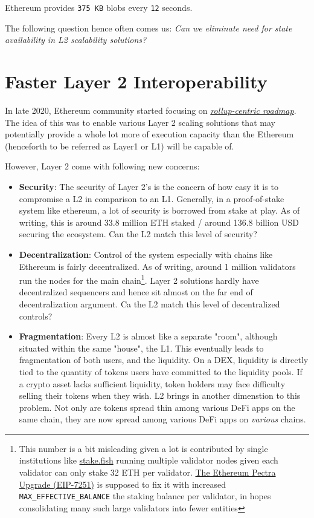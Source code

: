 Ethereum provides \texttt{375 KB} blobs every \texttt{12} seconds.

The following question hence often comes us: \emph{Can we eliminate need for state availability in L2 scalability solutions?}

\section{Faster Layer 2 Interoperability}
In late 2020, Ethereum community started focusing on \href{https://ethereum-magicians.org/t/a-rollup-centric-ethereum-roadmap/4698}{\emph{rollup-centric roadmap}}. The idea of this was to enable various Layer 2 scaling solutions that may potentially provide a whole lot more of execution capacity than the Ethereum (henceforth to be referred as Layer1 or L1) will be capable of. 

However, Layer 2 come with following new concerns:
\begin{itemize}
    \item \textbf{Security}: The security of Layer 2's is the concern of how easy it is to compromise a L2 in comparison to an L1. Generally, in a proof-of-stake system like ethereum, a lot of security is borrowed from stake at play. As of writing, this is around 33.8 million ETH staked / around 136.8 billion USD securing the ecosystem. Can the L2 match this level of security?
    \item \textbf{Decentralization}: Control of the system especially with chains like Ethereum is fairly decentralized. As of writing, around 1 million validators run the nodes for the main chain\footnote{This number is a bit misleading given a lot is contributed by single institutions like \href{stake.fish}{stake.fish} running multiple validator nodes given each validator can only stake 32 ETH per validator. \href{https://eips.ethereum.org/EIPS/eip-7251}{The Ethereum Pectra Upgrade (EIP-7251)} is supposed to fix it with increased \texttt{MAX\_EFFECTIVE\_BALANCE} the staking balance per validator, in hopes consolidating many such large validators into fewer entities}. Layer 2 solutions hardly have decentralized sequencers and hence sit almost on the far end of decentralization argument. Ca the L2 match this level of decentralized controls? 
    \item \textbf{Fragmentation}: Every L2 is almost like a separate "room", although situated within the same "house", the L1. This eventually leads to fragmentation of both users, and the liquidity. On a DEX, liquidity is directly tied to the quantity of tokens users have committed to the liquidity pools. If a crypto asset lacks sufficient liquidity, token holders may face difficulty selling their tokens when they wish. L2 brings in another dimenstion to this problem. Not only are tokens spread thin among various DeFi apps on the same chain, they are now spread among various DeFi apps on \emph{various} chains.
\end{itemize}


